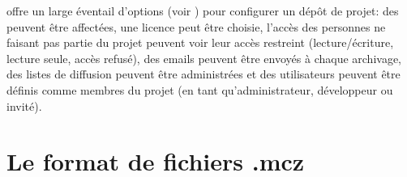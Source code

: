 \documentclass[a4paper,10pt,twoside]{book}
\begin{document}
\MC offre un large éventail d'options  (voir
) pour configurer un dépôt de projet:
des  peuvent être affectées, une
licence peut être choisie, l'accès des personnes ne faisant pas partie
du projet peuvent voir leur accès restreint (lecture/écriture, lecture
seule, accès refusé), des emails peuvent être envoyés à chaque
archivage, des listes de diffusion peuvent être administrées et des
utilisateurs peuvent être définis comme membres du projet (en tant
qu'administrateur, développeur ou invité).





\section{Le format de fichiers .mcz}
\end{document}

